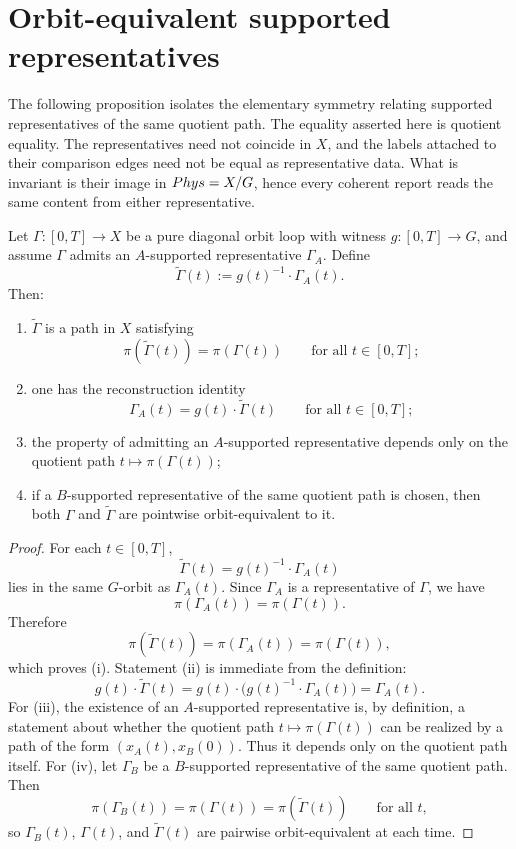 \section{Orbit-equivalent supported representatives}
\label{sec:twin}
The following proposition isolates the elementary symmetry relating
supported representatives of the same quotient path.
The equality asserted here is quotient equality.  The representatives
need not coincide in \(X\), and the labels attached to their comparison
edges need not be equal as representative data.  What is invariant is
their image in \(Phys=X/G\), hence every coherent report reads the same
content from either representative.
\begin{proposition}
	\label{prop:twin}
	Let \(\Gamma:[0,T]\to X\) be a pure diagonal orbit loop with witness
	\(g:[0,T]\to G\), and assume \(\Gamma\) admits an \(A\)-supported
	representative \(\Gamma_A\). Define
	\[
		\widetilde\Gamma(t):=g(t)^{-1}\cdot \Gamma_A(t).
	\]
	Then:
	\begin{enumerate}[label=\textup{(\roman*)}]
		\item \(\widetilde\Gamma\) is a path in \(X\) satisfying
		      \[
			      \pi(\widetilde\Gamma(t))=\pi(\Gamma(t))
			      \qquad
			      \text{for all }t\in[0,T];
		      \]
		\item one has the reconstruction identity
		      \[
			      \Gamma_A(t)=g(t)\cdot \widetilde\Gamma(t)
			      \qquad
			      \text{for all }t\in[0,T];
		      \]
		\item the property of admitting an \(A\)-supported representative
		      depends only on the quotient path \(t\mapsto \pi(\Gamma(t))\);
		\item if a \(B\)-supported representative of the same quotient path is
		      chosen, then both \(\Gamma\) and \(\widetilde\Gamma\) are pointwise
		      orbit-equivalent to it.
	\end{enumerate}
\end{proposition}
\begin{proof}
	For each \(t\in[0,T]\),
	\[
		\widetilde\Gamma(t)=g(t)^{-1}\cdot\Gamma_A(t)
	\]
	lies in the same \(G\)-orbit as \(\Gamma_A(t)\). Since \(\Gamma_A\) is a
	representative of \(\Gamma\), we have
	\[
		\pi(\Gamma_A(t))=\pi(\Gamma(t)).
	\]
	Therefore
	\[
		\pi(\widetilde\Gamma(t))=\pi(\Gamma_A(t))=\pi(\Gamma(t)),
	\]
	which proves \textup{(i)}.
	Statement \textup{(ii)} is immediate from the definition:
	\[
		g(t)\cdot \widetilde\Gamma(t)
		=
		g(t)\cdot \bigl(g(t)^{-1}\cdot \Gamma_A(t)\bigr)
		=
		\Gamma_A(t).
	\]
	For \textup{(iii)}, the existence of an \(A\)-supported representative
	is, by definition, a statement about whether the quotient path
	\(t\mapsto \pi(\Gamma(t))\) can be realized by a path of the form
	\((x_A(t),x_B(0))\). Thus it depends only on the quotient path itself.
	For \textup{(iv)}, let \(\Gamma_B\) be a \(B\)-supported representative
	of the same quotient path. Then
	\[
		\pi(\Gamma_B(t))=\pi(\Gamma(t))=\pi(\widetilde\Gamma(t))
		\qquad
		\text{for all }t,
	\]
	so \(\Gamma_B(t)\), \(\Gamma(t)\), and \(\widetilde\Gamma(t)\) are
	pairwise orbit-equivalent at each time.
\end{proof}

